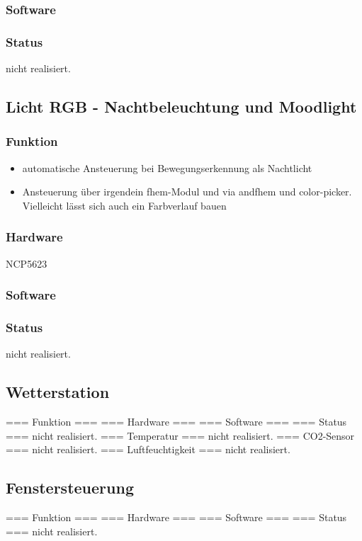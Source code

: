 \documentclass[a4paper,twoside,titlepage,normalheadings,tocleft,bibtotoc]{scrartcl}
\begin{document}
\begin{itemize}
\subsubsection{Software}
\subsubsection{Status}
nicht realisiert.

\subsection{Licht RGB - Nachtbeleuchtung und Moodlight}

\subsubsection{Funktion}
\begin{itemize}
\item automatische Ansteuerung bei Bewegungserkennung als Nachtlicht
\item Ansteuerung über irgendein fhem-Modul und via andfhem und color-picker. Vielleicht lässt sich auch ein Farbverlauf bauen
\end{itemize}

\subsubsection{Hardware}
NCP5623
\subsubsection{Software}
\subsubsection{Status}
nicht realisiert.

\subsection{Wetterstation}
=== Funktion ===
=== Hardware ===
=== Software ===
=== Status ===
nicht realisiert.
=== Temperatur ===
nicht realisiert.
=== CO2-Sensor ===
nicht realisiert.
=== Luftfeuchtigkeit ===
nicht realisiert.

\subsection{Fenstersteuerung}
=== Funktion ===
=== Hardware ===
=== Software ===
=== Status ===
nicht realisiert.


\end{itemize}
\end{document}
